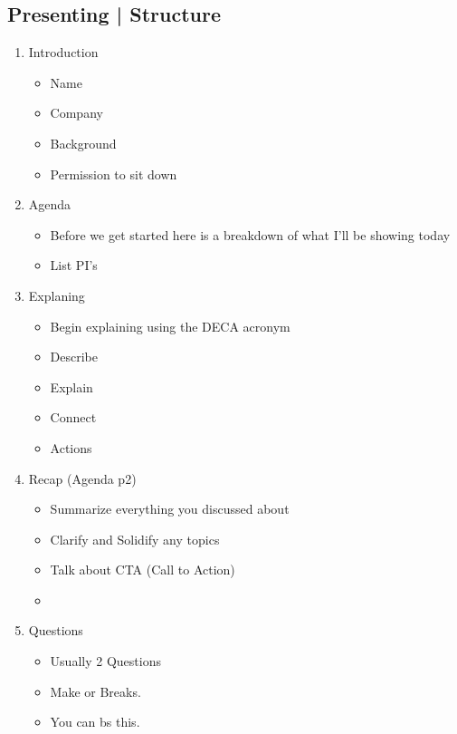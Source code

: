 \subsection*{Presenting | Structure}
\begin{enumerate}
    \item Introduction
        \begin{itemize}
            \item Name
            \item Company
            \item Background
            \item Permission to sit down
        \end{itemize}
    \item Agenda
        \begin{itemize}
            \item Before we get started here is a breakdown of what I'll be showing today
            \item List PI's
        \end{itemize}
    \item Explaning
        \begin{itemize}
            \item Begin explaining  using the DECA acronym
            \item {} Describe
            \item {} Explain
            \item {} Connect
            \item {} Actions
        \end{itemize}
    \item Recap (Agenda p2)
        \begin{itemize}
            \item Summarize everything you discussed about
            \item Clarify and Solidify any topics
            \item Talk about CTA (Call to Action)
            \item {}
        \end{itemize}
    \item Questions 
        \begin{itemize}
            \item Usually 2 Questions
            \item Make or Breaks.
            \item You can bs this. 
        \end{itemize}
\end{enumerate}



